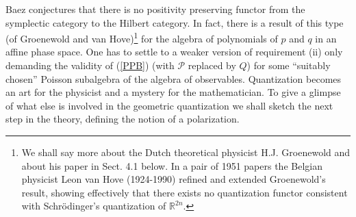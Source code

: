 Baez \cite{B06} conjectures that there is no positivity preserving functor from the symplectic category to
the Hilbert category. In fact, there is a result of this type (of Groenewold and van Hove)\footnote{We shall say more about the Dutch
theoretical physicist H.J. Groenewold and about his paper \cite{G46} in Sect. 4.1 below. In a pair of 1951 papers
the Belgian physicist Leon van Hove (1924-1990) refined and extended Groenewold's result, showing effectively
that there exists no quantization functor consistent with Schr\"odinger's quantization of ${\mathbb R}^{2n}$.}
for the algebra of polynomials of $p$ and $q$ in an  affine phase space. One has to 
settle to a weaker version of requirement (ii) only demanding the validity of 
(\ref{PPB}) (with $\mathcal{P}$ replaced by $Q$) for some ``suitably chosen'' 
Poisson subalgebra of the algebra of observables. Quantization becomes an art 
for the physicist and a mystery for the mathematician. To give a glimpse of 
what else is involved in the geometric quantization we shall sketch 
the next step in the theory, defining the notion of a polarization.


